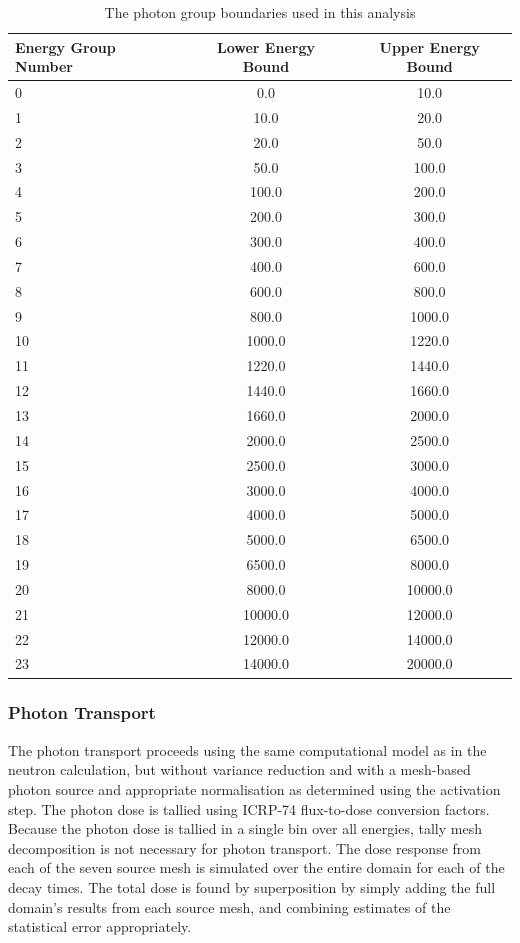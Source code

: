 \documentclass[12pt]{article}
\begin{document}
\begin{table}[ht!]
   \begin{tabular}{| l | c | c |}
      \hline
      Energy Group Number & Lower Energy Bound & Upper Energy Bound \\
      \hline
      0 & 0.0 & 10.0 \\
      1 & 10.0 & 20.0 \\
      2 & 20.0 & 50.0 \\
      3 & 50.0 & 100.0 \\
      4 & 100.0 & 200.0 \\
      5 & 200.0 & 300.0 \\
      6 & 300.0 & 400.0 \\
      7 & 400.0 & 600.0 \\
      8 & 600.0 & 800.0 \\
      9 & 800.0 & 1000.0 \\
      10 & 1000.0 & 1220.0 \\
      11 & 1220.0 & 1440.0 \\
      12 & 1440.0 & 1660.0 \\
      13 & 1660.0 & 2000.0 \\
      14 & 2000.0 & 2500.0 \\
      15 & 2500.0 & 3000.0 \\
      16 & 3000.0 & 4000.0 \\
      17 & 4000.0 & 5000.0 \\
      18 & 5000.0 & 6500.0 \\
      19 & 6500.0 & 8000.0 \\  
      20 & 8000.0 & 10000.0 \\
      21 & 10000.0 & 12000.0 \\
      22 & 12000.0 & 14000.0 \\
      23 & 14000.0 & 20000.0 \\  
      \hline
\end{tabular}
\caption{The photon group boundaries used in this analysis}
\label{tab:photon_boundaries}
\end{table}


\subsubsection{Photon Transport}
The photon transport proceeds using the same computational model as in the
neutron calculation, but without variance reduction and with a mesh-based
photon source and appropriate normalisation as determined using the activation
step.  The photon dose is tallied using ICRP-74 flux-to-dose conversion
factors.  Because the photon dose is tallied in a single bin over all
energies, tally mesh decomposition is not necessary for photon transport.  The
dose response from each of the seven source mesh is simulated over the entire
domain for each of the decay times.  The total dose is found by superposition
by simply adding the full domain's results from each source mesh, and
combining estimates of the statistical error appropriately.
\\
\\
\end{document}
